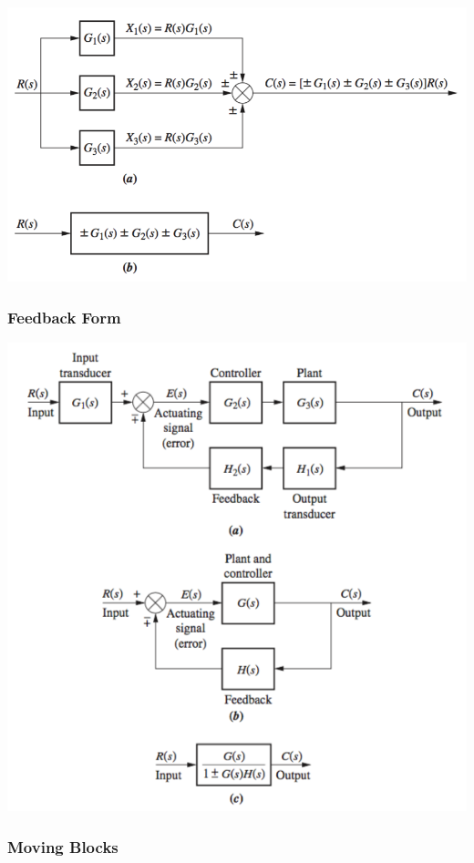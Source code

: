 \documentclass[11pt]{article}
\begin{document}
    \begin{center}
        \includegraphics[width=300 px]{img/parallel} \\
    \end{center}

    \subsubsection{Feedback Form}

    \begin{center}
        \includegraphics[width=300 px]{img/feedback} \\
    \end{center}

    \subsubsection{Moving Blocks}
\end{document}
